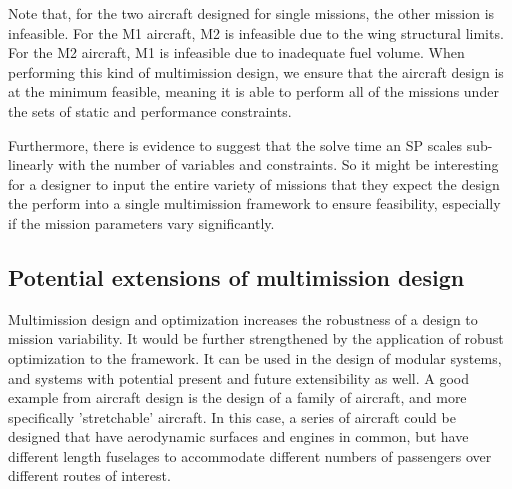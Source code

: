 \begin{center}
    
    \label{t:mmoutputs}
\end{center}

Note that, for the two aircraft designed for single missions, the other mission is infeasible. For the M1 aircraft,
M2 is infeasible due to the wing structural limits. For the M2 aircraft, M1 is infeasible due to inadequate
fuel volume. When performing this kind of multimission design, we ensure that the aircraft design is at the minimum feasible,
meaning it is able to perform all of the missions under the sets of static and performance constraints.

Furthermore, there is evidence to suggest that the solve time an \gls{SP} scales sub-linearly with the number of
variables and constraints. So it might be interesting for a designer to input the entire variety of missions that
they expect the design the perform into a single multimission framework to ensure feasibility, especially if the
mission parameters vary significantly.

\subsection{Potential extensions of multimission design}

Multimission design and optimization increases the robustness of a design to mission variability.
It would be further strengthened by the application of robust optimization to the framework. It can be used in the design
of modular systems, and systems with potential present and future extensibility as well.
A good example from aircraft design
is the design of a family of aircraft, and more specifically 'stretchable' aircraft. In
this case, a series of aircraft could be designed that have aerodynamic surfaces and engines
in common, but have different length fuselages to accommodate different numbers of passengers over different
routes of interest.

